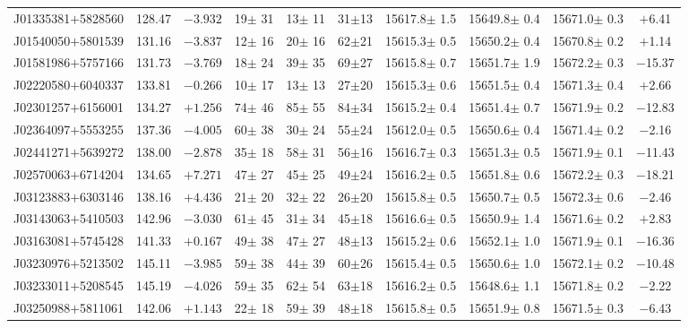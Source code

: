 \documentclass[printer]{aa} %
\begin{document}
\begin{landscape}
\begin{longtable}{cccccccccc}
J01335381$+$5828560 & 128.47 & $ -3.932$ &  19$\pm$ 31 &  13$\pm$ 11 & 31$\pm$13 & 15617.8$\pm$  1.5 & 15649.8$\pm$  0.4 & 15671.0$\pm$  0.3 &  $+$6.41\\
J01540050$+$5801539 & 131.16 & $ -3.837$ &  12$\pm$ 16 &  20$\pm$ 16 & 62$\pm$21 & 15615.3$\pm$  0.5 & 15650.2$\pm$  0.4 & 15670.8$\pm$  0.2 &  $+$1.14\\
J01581986$+$5757166 & 131.73 & $ -3.769$ &  18$\pm$ 24 &  39$\pm$ 35 & 69$\pm$27 & 15615.8$\pm$  0.7 & 15651.7$\pm$  1.9 & 15672.2$\pm$  0.3 & $-$15.37\\
J02220580$+$6040337 & 133.81 & $ -0.266$ &  10$\pm$ 17 &  13$\pm$ 13 & 27$\pm$20 & 15615.3$\pm$  0.6 & 15651.5$\pm$  0.4 & 15671.3$\pm$  0.4 &  $+$2.66\\
J02301257$+$6156001 & 134.27 & $ +1.256$ &  74$\pm$ 46 &  85$\pm$ 55 & 84$\pm$34 & 15615.2$\pm$  0.4 & 15651.4$\pm$  0.7 & 15671.9$\pm$  0.2 & $-$12.83\\
J02364097$+$5553255 & 137.36 & $ -4.005$ &  60$\pm$ 38 &  30$\pm$ 24 & 55$\pm$24 & 15612.0$\pm$  0.5 & 15650.6$\pm$  0.4 & 15671.4$\pm$  0.2 &  $-$2.16\\
J02441271$+$5639272 & 138.00 & $ -2.878$ &  35$\pm$ 18 &  58$\pm$ 31 & 56$\pm$16 & 15616.7$\pm$  0.3 & 15651.3$\pm$  0.5 & 15671.9$\pm$  0.1 & $-$11.43\\
J02570063$+$6714204 & 134.65 & $ +7.271$ &  47$\pm$ 27 &  45$\pm$ 25 & 49$\pm$24 & 15616.2$\pm$  0.5 & 15651.8$\pm$  0.6 & 15672.2$\pm$  0.3 & $-$18.21\\
J03123883$+$6303146 & 138.16 & $ +4.436$ &  21$\pm$ 20 &  32$\pm$ 22 & 26$\pm$20 & 15615.8$\pm$  0.5 & 15650.7$\pm$  0.5 & 15672.3$\pm$  0.6 &  $-$2.46\\
J03143063$+$5410503 & 142.96 & $ -3.030$ &  61$\pm$ 45 &  31$\pm$ 34 & 45$\pm$18 & 15616.6$\pm$  0.5 & 15650.9$\pm$  1.4 & 15671.6$\pm$  0.2 &  $+$2.83\\
J03163081$+$5745428 & 141.33 & $ +0.167$ &  49$\pm$ 38 &  47$\pm$ 27 & 48$\pm$13 & 15615.2$\pm$  0.6 & 15652.1$\pm$  1.0 & 15671.9$\pm$  0.1 & $-$16.36\\
J03230976$+$5213502 & 145.11 & $ -3.985$ &  59$\pm$ 38 &  44$\pm$ 39 & 60$\pm$26 & 15615.4$\pm$  0.5 & 15650.6$\pm$  1.0 & 15672.1$\pm$  0.2 & $-$10.48\\
J03233011$+$5208545 & 145.19 & $ -4.026$ &  59$\pm$ 35 &  62$\pm$ 54 & 63$\pm$18 & 15616.2$\pm$  0.5 & 15648.6$\pm$  1.1 & 15671.8$\pm$  0.2 &  $-$2.22\\
J03250988$+$5811061 & 142.06 & $ +1.143$ &  22$\pm$ 18 &  59$\pm$ 39 & 48$\pm$18 & 15615.8$\pm$  0.5 & 15651.9$\pm$  0.8 & 15671.5$\pm$  0.3 &  $-$6.43\\

\end{longtable}
\end{landscape}
\end{document}

